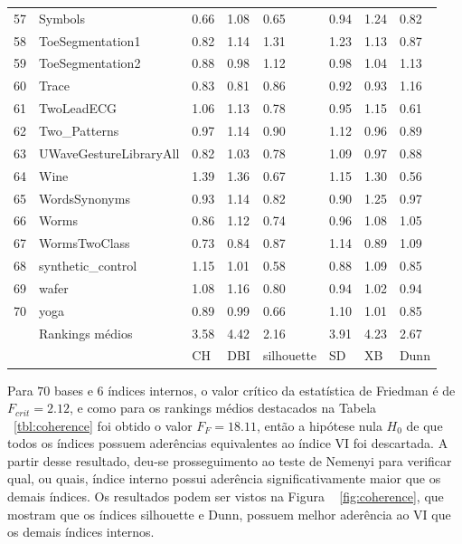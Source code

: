 \begin{longtable}{llllllll}
	57 &                         Symbols &  0.66 &  1.08 &       0.65 &  0.94 &  1.24 &  0.82 \\
	58 &                ToeSegmentation1 &  0.82 &  1.14 &       1.31 &  1.23 &  1.13 &  0.87 \\
	59 &                ToeSegmentation2 &  0.88 &  0.98 &       1.12 &  0.98 &  1.04 &  1.13 \\
	60 &                           Trace &  0.83 &  0.81 &       0.86 &  0.92 &  0.93 &  1.16 \\
	61 &                      TwoLeadECG &  1.06 &  1.13 &       0.78 &  0.95 &  1.15 &  0.61 \\
	62 &                    Two\_Patterns &  0.97 &  1.14 &       0.90 &  1.12 &  0.96 &  0.89 \\
	63 &          UWaveGestureLibraryAll &  0.82 &  1.03 &       0.78 &  1.09 &  0.97 &  0.88 \\
	64 &                            Wine &  1.39 &  1.36 &       0.67 &  1.15 &  1.30 &  0.56 \\
	65 &                   WordsSynonyms &  0.93 &  1.14 &       0.82 &  0.90 &  1.25 &  0.97 \\
	66 &                           Worms &  0.86 &  1.12 &       0.74 &  0.96 &  1.08 &  1.05 \\
	67 &                   WormsTwoClass &  0.73 &  0.84 &       0.87 &  1.14 &  0.89 &  1.09 \\
	68 &               synthetic\_control &  1.15 &  1.01 &       0.58 &  0.88 &  1.09 &  0.85 \\
	69 &                           wafer &  1.08 &  1.16 &       0.80 &  0.94 &  1.02 &  0.94 \\
	70 &                            yoga &  0.89 &  0.99 &       0.66 &  1.10 &  1.01 &  0.85 \\
	\midrule
	 \rowcolor{lightgray}    &			Rankings médios & 3.58 & 4.42 & 2.16 & 3.91 & 4.23 & 2.67 \\
	 	\midrule
	 {} &                         {} &    CH &   DBI & silhouette &    SD &    XB &  Dunn \\
	\bottomrule
\end{longtable}

Para $70$ bases e $6$ índices internos, o valor crítico da estatística de Friedman é de $F_{crit}=2.12$, e como  para os rankings médios destacados na Tabela ~\ref{tbl:coherence} foi obtido o valor $F_F = 18.11$, então a hipótese nula $H_0$ de que todos os índices possuem aderências equivalentes ao índice VI foi descartada. A partir desse resultado, deu-se prosseguimento ao teste de Nemenyi para verificar qual, ou quais, índice interno possui aderência significativamente maior que os demais índices. Os resultados podem ser vistos na Figura ~ \ref{fig:coherence}, que mostram que os índices silhouette e Dunn, possuem melhor aderência ao VI que os demais índices internos.

